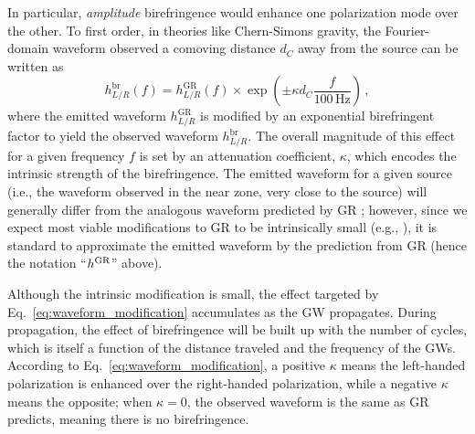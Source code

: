 \documentclass[aps,prd,twocolumn,superscriptaddress,preprintnumbers,nofootinbib]{revtex4-2}
\begin{document}
In particular, \emph{amplitude} birefringence would enhance one polarization mode over the other.
To first order, in theories like Chern-Simons gravity, the Fourier-domain waveform observed a comoving distance $d_C$ away from the source can be written as
\begin{equation}
    h_{L/R}^{\mathrm{br}}(f) =
    h_{L/R}^{\mathrm{GR}}(f) \times
    \exp\left(\pm\kappa d_C \frac{f}{100\,\mathrm{Hz}}\right)\,,
    \label{eq:waveform_modification}
\end{equation}
where the emitted waveform $h_{L/R}^{\mathrm{GR}}$ is modified by an exponential birefringent factor to yield the observed waveform $h_{L/R}^{\mathrm{br}}$.
The overall magnitude of this effect for a given frequency $f$ is set by an attenuation coefficient, $\kappa$, which encodes the intrinsic strength of the birefringence.
The emitted waveform for a given source (i.e., the waveform observed in the near zone, very close to the source) will generally differ from the analogous waveform predicted by \ac{GR} \cite{Alexander:2009tp,Okounkova:2019zjf}; however, since we expect most viable modifications to \ac{GR} to be intrinsically small (e.g., \cite{Okounkova:2022grv}), it is standard to approximate the emitted waveform by the prediction from \ac{GR} (hence the notation ``$h^{\rm GR}$'' above).

Although the intrinsic modification is small, the effect targeted by Eq.~\eqref{eq:waveform_modification} accumulates as the \ac{GW} propagates.
During propagation, the effect of birefringence will be built up with the number of cycles, which is itself a function of the distance traveled and the frequency of the \acp{GW}.
According to Eq.~\eqref{eq:waveform_modification}, a positive $\kappa$ means the left-handed polarization is enhanced over the right-handed polarization, while a negative $\kappa$ means the opposite;
when $\kappa=0$, the observed waveform is the same as \ac{GR} predicts, meaning there is no birefringence.
\end{document}
